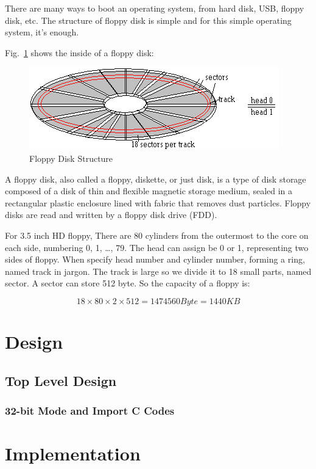 \documentclass{swfcthesis}
\begin{document}
There are many ways to boot an operating system, from hard disk, USB, floppy disk, etc.
The structure of floppy disk is simple and for this simple operating system, it's enough.

Fig.~\ref{fig:flpy1.png} shows the inside of a floppy disk:
\begin{figure}[!ht]
  \centering
  \includegraphics[width=.5\textwidth]{../figs/bootLoader/flpy1.png}
  \caption{Floppy Disk Structure}
  \label{fig:flpy1.png}
\end{figure}

A floppy disk, also called a floppy, diskette, or just disk, is a type of disk storage
composed of a disk of thin and flexible magnetic storage medium, sealed in a rectangular
plastic enclosure lined with fabric that removes dust particles. Floppy disks are read and
written by a floppy disk drive (FDD).

For 3.5 inch HD floppy,  There are 80 cylinders from the outermost to
the core on each side, numbering 0, 1, \ldots, 79. The head can assign be 0 or 1,
representing two sides of floppy. When specify head number and cylinder number, forming a
ring, named track in jargon. The track is large so we divide it to 18 small parts, named
sector. A sector can store 512 byte. So the capacity of a floppy is:

\[18 \times 80 \times 2 \times 512 = 1474560 Byte = 1440 KB\]


\chapter{Design}

\section{Top Level Design}
\label{sec:top-level-design}


\subsection{32-bit Mode and Import C Codes}
\label{sec:32-bit-mode}


\chapter{Implementation}
\end{document}
